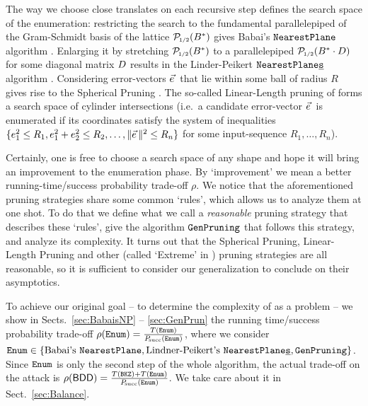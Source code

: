 The way we choose close translates on each recursive step defines the search space of the enumeration: restricting the search to the fundamental parallelepiped of the Gram-Schmidt basis of the lattice $\smash{\mathcal{P}\mkern-3mu_{\mbox{\tiny 1/2}}}(B^*)$ gives Babai's $\texttt{NearestPlane}$ algorithm \cite{STACS:Babai85}. 
Enlarging it by stretching $\smash{\mathcal{P}\mkern-3mu_{\mbox{\tiny 1/2}}}(B^*)$ to a parallelepiped $ \smash{\mathcal{P}\mkern-3mu_{\mbox{\tiny 1/2}}}(B^* \cdot D)$ for some diagonal matrix $D$ results in the Linder-Peikert $\texttt{NearestPlane\underline{s}}$ algorithm \cite{RSA:LinPei11}.
Considering error-vectors $\evec$ that lie within some ball of radius $R$ gives rise to the Spherical Pruning \cite{SchE94}.
The so-called Linear-Length pruning of \cite{EC:GamNguReg10} forms a search space of cylinder intersections (i.e.\ a candidate error-vector $\evec$ is enumerated if its coordinates satisfy the system of inequalities $\{e_1^2 \leq R_1, e_1^2 + e_2^2 \leq R_2, \ldots, \| \evec \|^2 \leq R_n \}$ for some input-sequence $R_1, \ldots, R_n$).

Certainly, one is free to choose a search space of any shape and hope it will bring an improvement to the enumeration phase. By `improvement' we mean a better running-time/success probability trade-off $\rho$. We notice that the aforementioned pruning strategies share some common `rules', which allows us to analyze them at one shot.  To do that we define what we call a \emph{reasonable} pruning strategy that describes these `rules', give the algorithm $\texttt{GenPruning}$ that follows this strategy, and analyze its complexity. It turns out that the Spherical Pruning, Linear-Length Pruning and other (called `Extreme' in \cite{EC:GamNguReg10}) pruning strategies are all reasonable, so it is sufficient to consider our generalization to conclude on their asymptotics.

To achieve our original goal -- to determine the complexity of \LWE as a \BDD problem -- we show in Sects.~\ref{sec:BabaisNP} -- \ref{sec:GenPrun} the running time/success probability trade-off $\rho(\texttt{Enum}) = \frac{T(\texttt{Enum})}{P\mkern-4mu_{\mbox{\tiny succ}}(\texttt{Enum})}$, where we consider $\texttt{Enum} \in\{ \text{Babai's } \texttt{NearestPlane}, \allowbreak \text{Lindner-Peikert's } \texttt{NearestPlane\underline{s}}, \texttt{GenPruning} \}$. Since $\texttt{Enum}$ is only the second step of the whole algorithm, the actual trade-off on the \BDD attack is $\rho(\textsf{BDD}) = \frac{T(\texttt{BKZ}) + T(\texttt{Enum})}{P\mkern-4mu_{\mbox{\tiny succ}}(\texttt{Enum})}$. We take care about it in Sect.~\ref{sec:Balance}.














\clearpage
